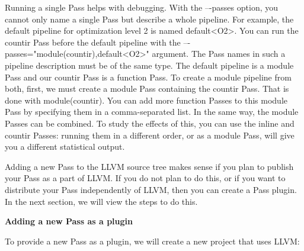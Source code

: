 Running a single Pass helps with debugging. With the –-passes option, you cannot only name a single Pass but describe a whole pipeline. For example, the default pipeline for optimization level 2 is named default<O2>. You can run the countir Pass before the default pipeline with the –-passes="module(countir),default<O2>" argument. The Pass names in such a pipeline description must be of the same type. The default pipeline is a module Pass and our countir Pass is a function Pass. To create a module pipeline from both, first, we must create a module Pass containing the countir Pass. That is done with module(countir). You can add more function Passes to this module Pass by specifying them in a comma-separated list. In the same way, the module Passes can be combined. To study the effects of this, you can use the inline and countir Passes: running them in a different order, or as a module Pass, will give you a different statistical output.\par

Adding a new Pass to the LLVM source tree makes sense if you plan to publish your Pass as a part of LLVM. If you do not plan to do this, or if you want to distribute your Pass independently of LLVM, then you can create a Pass plugin. In the next section, we will view the steps to do this.\par


\hspace*{\fill} \par %
\textbf{Adding a new Pass as a plugin}

To provide a new Pass as a plugin, we will create a new project that uses LLVM:\par

